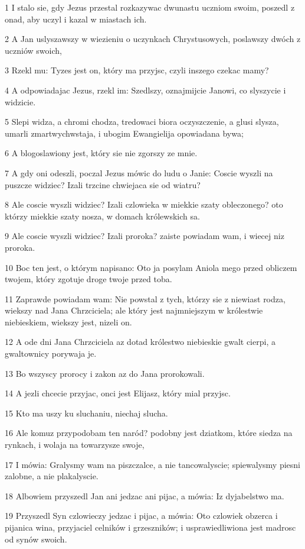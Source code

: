 \par 1 I stalo sie, gdy Jezus przestal rozkazywac dwunastu uczniom swoim, poszedl z onad, aby uczyl i kazal w miastach ich.
\par 2 A Jan uslyszawszy w wiezieniu o uczynkach Chrystusowych, poslawszy dwóch z uczniów swoich,
\par 3 Rzekl mu: Tyzes jest on, który ma przyjsc, czyli inszego czekac mamy?
\par 4 A odpowiadajac Jezus, rzekl im: Szedlszy, oznajmijcie Janowi, co slyszycie i widzicie.
\par 5 Slepi widza, a chromi chodza, tredowaci biora oczyszczenie, a glusi slysza, umarli zmartwychwstaja, i ubogim Ewangielija opowiadana bywa;
\par 6 A blogoslawiony jest, który sie nie zgorszy ze mnie.
\par 7 A gdy oni odeszli, poczal Jezus mówic do ludu o Janie: Coscie wyszli na puszcze widziec? Izali trzcine chwiejaca sie od wiatru?
\par 8 Ale coscie wyszli widziec? Izali czlowieka w miekkie szaty obleczonego? oto którzy miekkie szaty nosza, w domach królewskich sa.
\par 9 Ale coscie wyszli widziec? Izali proroka? zaiste powiadam wam, i wiecej niz proroka.
\par 10 Boc ten jest, o którym napisano: Oto ja posylam Aniola mego przed obliczem twojem, który zgotuje droge twoje przed toba.
\par 11 Zaprawde powiadam wam: Nie powstal z tych, którzy sie z niewiast rodza, wiekszy nad Jana Chrzciciela; ale który jest najmniejszym w królestwie niebieskiem, wiekszy jest, nizeli on.
\par 12 A ode dni Jana Chrzciciela az dotad królestwo niebieskie gwalt cierpi, a gwaltownicy porywaja je.
\par 13 Bo wszyscy prorocy i zakon az do Jana prorokowali.
\par 14 A jezli chcecie przyjac, onci jest Elijasz, który mial przyjsc.
\par 15 Kto ma uszy ku sluchaniu, niechaj slucha.
\par 16 Ale komuz przypodobam ten naród? podobny jest dziatkom, które siedza na rynkach, i wolaja na towarzysze swoje,
\par 17 I mówia: Gralysmy wam na piszczalce, a nie tancowalyscie; spiewalysmy piesni zalobne, a nie plakalyscie.
\par 18 Albowiem przyszedl Jan ani jedzac ani pijac, a mówia: Iz dyjabelstwo ma.
\par 19 Przyszedl Syn czlowieczy jedzac i pijac, a mówia: Oto czlowiek obzerca i pijanica wina, przyjaciel celników i grzeszników; i usprawiedliwiona jest madrosc od synów swoich.
